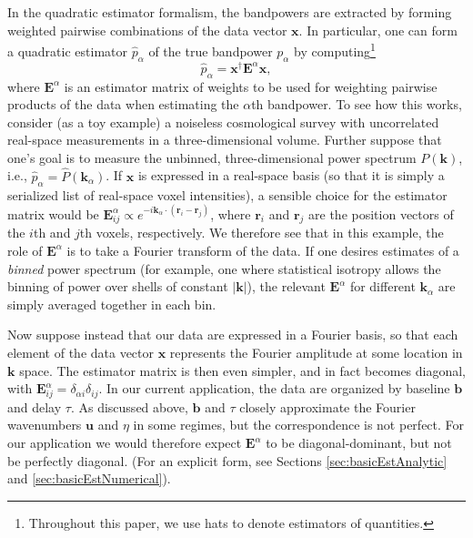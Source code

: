 \documentclass[twocolumn,aps,prd,nofootinbib,showpacs]{revtex4-1}
\begin{document}
In the quadratic estimator formalism, the bandpowers are extracted by forming weighted pairwise combinations of the data vector $\mathbf{x}$.  In particular, one can form a quadratic estimator $\widehat{p}_\alpha$ of the true bandpower $p_\alpha$ by computing\footnote{Throughout this paper, we use hats to denote estimators of quantities.}
\begin{equation}
\label{eq:GenQuadEst}
\widehat{p}_\alpha = \mathbf{x}^\dagger \mathbf{E}^\alpha \mathbf{x},
\end{equation}
where $\mathbf{E}^\alpha$ is an estimator matrix of weights to be used for weighting pairwise products of the data when estimating the $\alpha$th bandpower.  To see how this works, consider (as a toy example) a noiseless cosmological survey 
with uncorrelated real-space measurements in a three-dimensional volume.  Further suppose that one's goal is to measure the unbinned, three-dimensional power spectrum $P(\mathbf{k})$, i.e., $\widehat{p}_\alpha = \widehat{P}(\mathbf{k}_\alpha)$.  If $\mathbf{x}$ is expressed in a real-space basis (so that it is simply a serialized list of real-space voxel intensities), a sensible choice for the estimator matrix would be $\mathbf{E}^\alpha_{ij} \propto e^{-i \mathbf{k}_\alpha \cdot (\mathbf{r}_i - \mathbf{r}_j)}$, where $\mathbf{r}_i$ and $\mathbf{r}_j$ are the position vectors of the $i$th and $j$th voxels, respectively.  We therefore see that in this example, the role of $\mathbf{E}^\alpha$ is to take a Fourier transform of the data.  If one desires estimates of a \emph{binned} power spectrum (for example, one where statistical isotropy allows the binning of power over shells of constant $|\mathbf{k}|$), the relevant $\mathbf{E}^\alpha$ for different $\mathbf{k}_\alpha$ are simply averaged together in each bin.

Now suppose instead that our data are expressed in a Fourier basis, so that each element of the data vector $\mathbf{x}$ represents the Fourier amplitude at some location in $\mathbf{k}$ space.  The estimator matrix is then even simpler, and in fact becomes diagonal, with $\mathbf{E}^\alpha_{ij} = \delta_{\alpha i} \delta_{ij}$.  In our current application, the data are organized by baseline $\mathbf{b}$ and delay $\tau$.  As discussed above, $\mathbf{b}$ and $\tau$ closely approximate the Fourier wavenumbers $\mathbf{u}$ and $\eta$ in some regimes, but the correspondence is not perfect.  For our application we would therefore expect $\mathbf{E}^\alpha$ to be diagonal-dominant, but not be perfectly diagonal.  (For an explicit form, see Sections \ref{sec:basicEstAnalytic} and \ref{sec:basicEstNumerical}).
\end{document}

